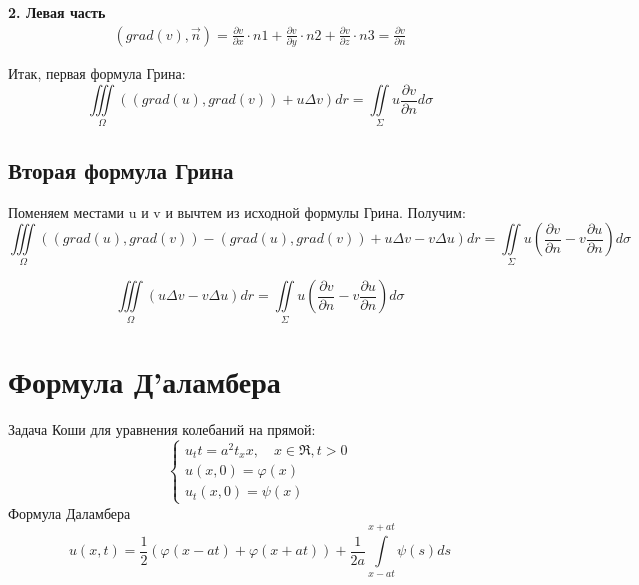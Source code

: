 \documentclass[11pt,a4paper]{article}
\begin{document}
\textbf{2. Левая часть} \\
\begin{equation}
\begin{split}
(grad(v), \vec{n}) = \frac{\partial v}{\partial x} \cdot n1 + \frac{\partial v}{\partial y} \cdot n2 + \frac{\partial v}{\partial z} \cdot n3 = \frac{\partial v}{\partial n}
\end{split}
\end{equation}

Итак, первая формула Грина:
$$
\iiint \limits_{\varOmega} ((grad(u), grad(v)) + u\Delta v)dr = \iint \limits_{\Sigma} u  \frac{\partial v}{\partial n} d\sigma
$$

\subsection{Вторая формула Грина}
Поменяем местами u и v и вычтем из исходной формулы Грина. Получим:
$$
\iiint \limits_{\varOmega} ((grad(u), grad(v)) - (grad(u), grad(v)) + u\Delta v -  v\Delta u)dr = \iint \limits_{\Sigma} u  (\frac{\partial v}{\partial n} -  v  \frac{\partial u}{\partial n}) d\sigma
$$

$$
\iiint \limits_{\varOmega} (u\Delta v -  v\Delta u)dr = \iint \limits_{\Sigma} u  (\frac{\partial v}{\partial n} -  v  \frac{\partial u}{\partial n}) d\sigma
$$

\section{Формула Д'аламбера}
Задача Коши для уравнения колебаний на прямой:
$$
\begin{cases}
	u_tt = a^2t_xx, \quad x \in \Re, t > 0\\
	u(x,0) = \varphi(x) \\
	u_t(x,0) = \psi(x)
\end{cases}
$$
Формула Даламбера
$$
u(x,t) = \frac{1}{2}(\varphi(x-at) + \varphi(x+at)) + \frac{1}{2a} \int\limits_{x-at}^{x+at} \psi(s)ds
$$
\end{document}
